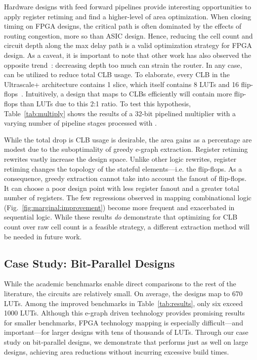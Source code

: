 Hardware designs with feed forward pipelines provide interesting opportunities
to apply register retiming and find a higher-level of area optimization. When
closing timing on FPGA designs, the critical path is often dominated by the
effects of routing congestion, more so than ASIC design. Hence, reducing the
cell count and circuit depth along the max delay path is a valid optimization
strategy for FPGA design. As a caveat, it is important to note that other work
has also observed the opposite trend~\cite{academicfpga}: decreasing depth too
much can strain the router. In any case, \shortname{} can be utilized to reduce total
CLB usage. To elaborate, every CLB in the Ultrascale+ architecture contains 1
slice, which itself contains 8 LUTs and 16 flip-flops~\cite{ug574}.
Intuitively, a design that maps to CLBs efficiently will contain more
flip-flops than LUTs due to this 2:1 ratio. To test this hypothesis,
Table~\ref{tab:multiply} shows the results of a 32-bit pipelined multiplier
with a varying number of pipeline stages processed with \shortname{}.

While the total drop is CLB usage is desirable, the area gains as a percentage
are modest due to the suboptimality of greedy e-graph extraction. Register
retiming rewrites vastly increase the design space. Unlike other logic
rewrites, register retiming changes the topology of the stateful
elements---i.e. the flip-flops. As a consequence, greedy extraction cannot take
into account the fanout of flip-flops. It can choose a poor design point with
less register fanout and a greater total number of registers. The few
regressions observed in mapping combinational logic
(Fig.~\ref{fig:marginal:improvement}) become more frequent and exacerbated in
sequential logic. While these results \textit{do} demonstrate that optimizing
for CLB count over raw cell count is a feasible strategy, a different
extraction method will be needed in future work.

\subsection{Case Study: Bit-Parallel Designs}\label{sec:results:scalability}

While the academic benchmarks enable direct comparisons to the rest of the
literature, the circuits are relatively small. On average, the designs map to
670 LUTs. Among the \nimproved{} improved benchmarks in
Table~\ref{tab:results}, only six exceed 1000 LUTs. Although this e-graph
driven technology provides promising results for smaller benchmarks, FPGA
technology mapping is especially difficult---and important---for larger designs
with tens of thousands of LUTs. Through our case study on bit-parallel designs,
we demonstrate that \shortname{} performs just as well on large designs,
achieving area reductions without incurring excessive build times.

